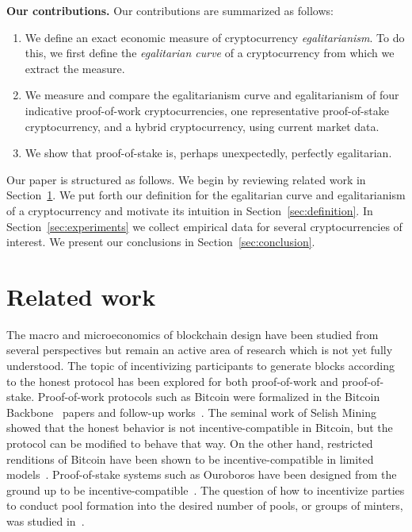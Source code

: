 \noindent
\textbf{Our contributions.}
Our contributions are summarized as follows:

\begin{enumerate}
  \item We define an exact economic measure of cryptocurrency
        \emph{egalitarianism}.
        To do this, we first define the \emph{egalitarian curve} of a
        cryptocurrency from which we extract the measure.
  \item We measure and compare the egalitarianism curve and egalitarianism of
        four indicative proof-of-work cryptocurrencies, one representative
        proof-of-stake cryptocurrency, and a hybrid cryptocurrency, using
        current market data.
  \item We show that proof-of-stake is, perhaps unexpectedly, perfectly
        egalitarian.
\end{enumerate}

Our paper is structured as follows. We begin by reviewing related work in
Section~\ref{sec:related}. We put forth our definition for the egalitarian curve
and egalitarianism of a cryptocurrency and motivate its intuition in
Section~\ref{sec:definition}. In Section~\ref{sec:experiments} we collect
empirical data for several cryptocurrencies of interest. We present our
conclusions in Section~\ref{sec:conclusion}.

\section{Related work}\label{sec:related}
The macro and microeconomics of blockchain design have
been studied from several perspectives but remain an active area of research
which is not yet fully understood. The topic of incentivizing participants to
generate blocks according to the honest protocol has been explored for both
proof-of-work and proof-of-stake. Proof-of-work protocols such as Bitcoin were
formalized in the Bitcoin Backbone~\cite{backbone1,backbone2} papers and
follow-up works~\cite{pass}. The seminal work of Selish Mining~\cite{selfish}
showed that the honest behavior is not incentive-compatible in Bitcoin, but the
protocol can be modified to behave that way. On the other hand, restricted
renditions of Bitcoin have been shown to be incentive-compatible in limited
models~\cite{tselekounis-kiayias}. Proof-of-stake systems such as Ouroboros
have been designed from the ground up to be
incentive-compatible~\cite{ouroboros}. The question of how to incentivize
parties to conduct pool formation into the desired number of pools, or groups of minters, was studied
in~\cite{stouka-koutsoupias-kiayias}.

